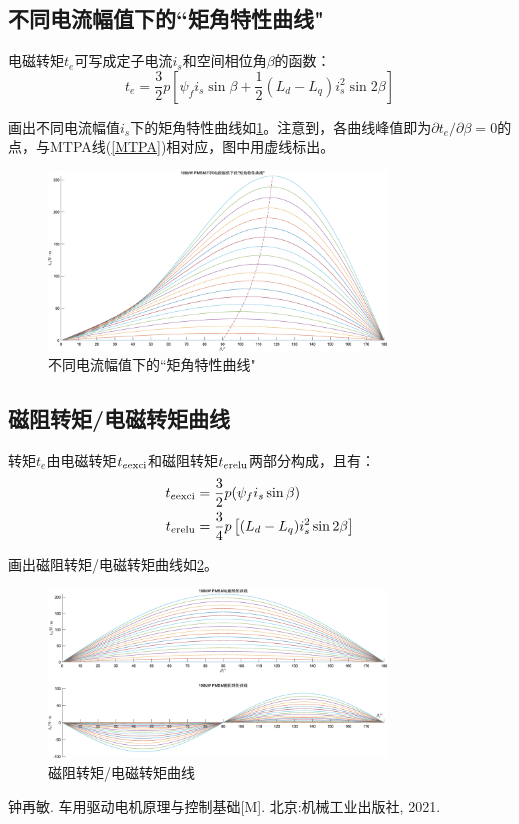\documentclass[UTF8]{ctexart}
\numberwithin{figure}{section}
\numberwithin{table}{section}
\begin{document}
\subsection{不同电流幅值下的``矩角特性曲线"}
\label{subsection:2.10}

电磁转矩$t_e$可写成定子电流$i_s$和空间相位角$\beta$的函数\cite{b}：
\begin{equation}
	t_e=\frac{3}{2}p\left[\psi_f i_s \sin{\beta}+\frac{1}{2}(L_d-L_q)i_s^2\sin{2\beta}\right]
\end{equation}

画出不同电流幅值$i_s$下的矩角特性曲线如\cref{torAng}。注意到，各曲线峰值即为$\partial t_e/\partial\beta=0$的点，与MTPA线(\cref{MTPA})相对应，图中用虚线标出。

\begin{figure}[htbp]
	\centering
	\includegraphics[width=0.8\textwidth]{10}
	\caption{不同电流幅值下的``矩角特性曲线"}
	\label{torAng}
\end{figure}

\subsection{磁阻转矩/电磁转矩曲线}
\label{subsection:2.11}

转矩$t_e$由电磁转矩$t_{e\rm exci}$和磁阻转矩$t_{e\rm relu}$两部分构成，且有\cite{b}：
\begin{align}
	t_{e\rm exci} & =\frac{3}{2}p(\psi_f i_s \sin{\beta})                \\
	t_{e\rm relu} & =\frac{3}{4}p\left[(L_d-L_q)i_s^2\sin{2\beta}\right]
\end{align}

画出磁阻转矩/电磁转矩曲线如\cref{torExciReluAng}。

\begin{figure}[htbp]
	\centering
	\includegraphics[width=0.8\textwidth]{11}
	\caption{磁阻转矩/电磁转矩曲线}
	\label{torExciReluAng}
\end{figure}

\clearpage

\begin{thebibliography}{99}
	钟再敏. 车用驱动电机原理与控制基础[M]. 北京:机械工业出版社, 2021.
\end{thebibliography}
\end{document}
